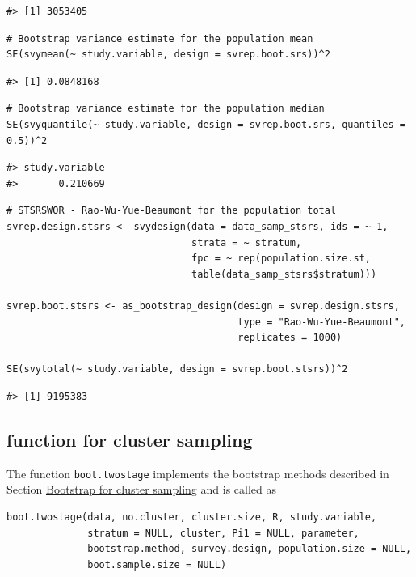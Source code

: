 \begin{verbatim}
#> [1] 3053405
\end{verbatim}

\begin{verbatim}
# Bootstrap variance estimate for the population mean
SE(svymean(~ study.variable, design = svrep.boot.srs))^2
\end{verbatim}

\begin{verbatim}
#> [1] 0.0848168
\end{verbatim}

\begin{verbatim}
# Bootstrap variance estimate for the population median
SE(svyquantile(~ study.variable, design = svrep.boot.srs, quantiles = 0.5))^2
\end{verbatim}

\begin{verbatim}
#> study.variable 
#>       0.210669
\end{verbatim}

\begin{verbatim}
# STSRSWOR - Rao-Wu-Yue-Beaumont for the population total
svrep.design.stsrs <- svydesign(data = data_samp_stsrs, ids = ~ 1,
                                strata = ~ stratum,
                                fpc = ~ rep(population.size.st, 
                                table(data_samp_stsrs$stratum)))

svrep.boot.stsrs <- as_bootstrap_design(design = svrep.design.stsrs,
                                        type = "Rao-Wu-Yue-Beaumont",
                                        replicates = 1000)

SE(svytotal(~ study.variable, design = svrep.boot.stsrs))^2
\end{verbatim}

\begin{verbatim}
#> [1] 9195383
\end{verbatim}

\subsection{\texorpdfstring{ function for cluster sampling}{ function for cluster sampling}}\label{sec:pkgbootsurvclust}

The function \texttt{boot.twostage} implements the bootstrap methods described in Section \hyperref[Boot_TwoStage]{Bootstrap for cluster sampling} and is called as

\begin{verbatim}
boot.twostage(data, no.cluster, cluster.size, R, study.variable,
              stratum = NULL, cluster, Pi1 = NULL, parameter,
              bootstrap.method, survey.design, population.size = NULL,
              boot.sample.size = NULL)
\end{verbatim}

